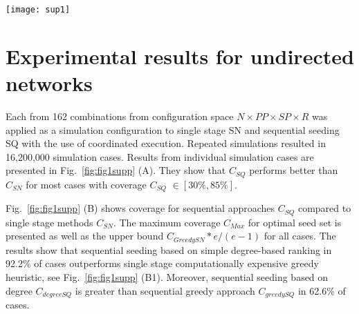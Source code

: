 \documentclass[11pt]{article} %
\begin{document}
\begin{figure*}[!htb]
\centering

\centering
\texttt{[image: sup1]}
\caption{\textbf{(A)} Coverage for sequential approach $C_{SQ}$ compared with single stage $C_{SN}$ and maximum coverage $C_{Max}$ for all configurations and all simulation cases; ordered by $C_{SN}$; \textbf{(B)} Coverage as percentage of all activated network nodes for greedy and degree-based single stage and sequential strategies and their relation to $C_{Max}$ and the upper bound; ordered by $C_{SN}$; \textbf{(B1)} Performance of sequential and single stage approaches with degree-based selection in relation to single stage greedy ranking;\textbf{(C)} Performance of sequential seeding SQ in the relation to single stage seeding SN, a vertical tick denotes percentage of cases with no gain: $C_{SQ}=C_{SN}$; \textbf{(C1)} Performance of random, degree and greedy based sequential seeding compared with single stage seeding SN; \textbf{(D)} Steps of one sequential and one single stage diffusion process in the coordinated execution for one configuration; \textbf{(E)} Coverage values for sequential $C_{SQ}$ and single stage seeding $C_{SN}$ as well as maximum coverage $C_{Max}$ for networks N1-N6 and all simulation cases.}
\label{fig:fig1supp}

\end{figure*}

\section*{Experimental results for undirected networks}

Each from 162 combinations from configuration space $N \times  PP \times  SP \times R$ was applied as a simulation configuration to single stage SN and sequential seeding SQ with the use of coordinated execution. Repeated simulations resulted in 16,200,000 simulation cases. Results from individual simulation cases are presented in Fig.~\ref{fig:fig1supp} (A). They show that $C_{SQ}$ performs better than $C_{SN}$ for most cases with coverage $C_{SQ}$ $\in [30\%,85\%]$.

Fig.~\ref{fig:fig1supp} (B) shows coverage for sequential approaches $C_{SQ}$ compared to single stage methods $C_{SN}$. The maximum coverage $C_{Max}$ for optimal seed set is presented as well as the upper bound $C_{GreedySN} * e/(e-1)$ for all cases. The results show that sequential seeding based on simple degree-based ranking in 92.2\% of cases outperforms single stage computationally expensive greedy heuristic, see Fig.~\ref{fig:fig1supp} (B1). Moreover, sequential seeding based on degree $C_{degreeSQ}$ is greater than sequential greedy approach $C_{greedySQ}$ in 62.6\% of cases.
\end{document}
